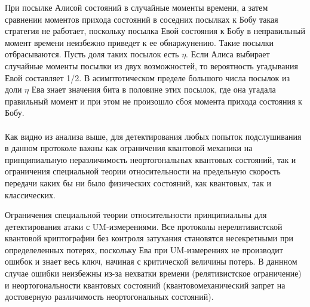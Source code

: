 При посылке Алисой состояний в случайные моменты времени, а затем сравнении моментов прихода состояний в соседних посылках к Бобу такая стратегия не работает, поскольку посылка Евой состояния к Бобу в неправильный момент времени неизбежно приведет к ее обнаржунению. 
Такие посылки отбрасываются. Пусть доля таких посылок есть $\eta$. Если Алиса выбирает случайные моменты посылки из двух возможностей, то вероятность угадывания Евой составляет 1/2. В асимптотическом пределе большого числа посылок из доли $\eta$ Ева знает значения бита в половине этих посылок, где она угадала правильный момент и при этом не произошло сбоя момента прихода состояния к Бобу.

\paragraph{}
Как видно из анализа выше, для детектирования любых попыток подслушивания в данном протоколе важны как ограничения квантовой механики на принципиальную неразличимость неортогональных квантовых состояний, так и ограничения специальной теории относительности на предельную скорость передачи каких бы ни было физических состояний, как квантовых, так и классических.

Ограничения специальной теории относительности принципиальны для детектирования атаки с UM-измерениями. Все протоколы нерелятивистской квантовой криптографии без контроля затухания становятся несекретными при определеленных потерях, поскольку Ева при UM-измерениях не производит ошибок и знает весь ключ, начиная с критической величины потерь. В даннном случае ошибки неизбежны из-за нехватки времени (релятивистское ограничение) и неортогональности квантовых состояний (квантовомеханический запрет на достоверную различимость неортогональных состояний).